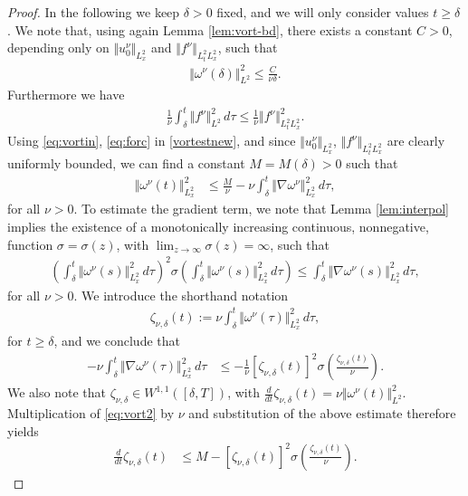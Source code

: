 \documentclass[reqno,12pt]{amsart}
\begin{document}
\begin{proof}
In the following we keep $\delta > 0$ fixed, and we will only consider values $t \ge \delta$. We note that, using again Lemma \ref{lem:vort-bd}, there exists a constant $C >0$, depending only on $\Vert u_0^\nu\Vert_{L^2_x}$ and $\Vert f^\nu \Vert_{L^2_tL^2_x}$, such that
\begin{align} \label{eq:vortin}
\Vert \omega^\nu(\delta) \Vert^2_{L^2}
\le \frac{C}{\nu \delta }.
\end{align}
Furthermore we have
\begin{align} \label{eq:forc}
\frac{1}{\nu} \int_\delta^t \Vert f^\nu \Vert^2_{L^2} \, d\tau
\le
\frac{1}{\nu}\Vert f^\nu \Vert_{L^2_tL^2_x}^2 .
\end{align}
Using \eqref{eq:vortin}, \eqref{eq:forc} in \eqref{vortestnew}, and since $\Vert u_0^\nu \Vert_{L^2_x}$, $\Vert f^\nu \Vert_{L^2_tL^2_x}$ are clearly uniformly bounded, we can find a constant $M = M(\delta)> 0$  such that
\begin{align} \label{eq:vort2}
\Vert \omega^\nu(t) \Vert_{L^2_x}^2
&\le
\frac{M}{\nu}
- \nu \int_\delta^t \Vert \nabla \omega^\nu \Vert_{L^2_x}^2 \, d\tau,
\end{align}
for all $\nu > 0$.
To estimate the gradient term, we note that Lemma \ref{lem:interpol} implies the existence of a monotonically increasing continuous, nonnegative, function $\sigma=\sigma(z)$, with $\lim_{z\to \infty} \sigma(z) = \infty$, such that
\begin{align} \label{eq:diff}
\left(
\int_\delta^t \Vert \omega^\nu(s) \Vert_{L^2_x}^2 \, d\tau
\right)^2
\sigma\left(
\int_\delta^t \Vert \omega^\nu(s) \Vert_{L^2_x}^2 \, d\tau
\right)
\le
\int_\delta^t \Vert \nabla \omega^\nu(s) \Vert_{L^2_x}^2 \, d\tau,
\end{align}
for all $\nu > 0$. We introduce the shorthand notation
\begin{align} \label{eq:zetadef}
\zeta_{\nu,\delta}(t) := \nu \int_\delta^t \Vert \omega^\nu(\tau) \Vert_{L^2_x}^2 \, d\tau,
\end{align}
for $t \ge \delta$, and we conclude that
\begin{align*}
-\nu \int_\delta^t \Vert \nabla \omega^\nu(\tau) \Vert_{L^2_x}^2 \, d\tau
&\le
-\frac{1}{\nu} [\zeta_{\nu,\delta}(t)]^2
\sigma\left(\frac{\zeta_{\nu,\delta}(t)}{\nu}
\right).
\end{align*}
We also note that $\zeta_{\nu,\delta}\in W^{1,1}([\delta,T])$, with $\frac{d}{dt} \zeta_{\nu,\delta}(t) = \nu \Vert \omega^\nu(t) \Vert^2_{L^2}$. Multiplication of \eqref{eq:vort2} by $\nu$ and substitution of the above estimate therefore yields
\begin{align} \label{eq:diffineq}
\frac{d}{dt} \zeta_{\nu,\delta}(t)
&\le
M
- [\zeta_{\nu,\delta}(t)]^2
\sigma\left(\frac{\zeta_{\nu,\delta}(t)}{\nu}
\right).
\end{align}


\end{proof}
\end{document}
